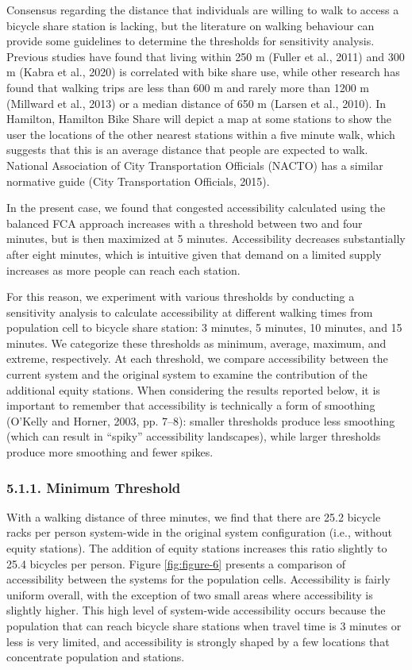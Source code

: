\documentclass[]{elsarticle} %
\begin{document}
Consensus regarding the distance that individuals are willing to walk to
access a bicycle share station is lacking, but the literature on walking
behaviour can provide some guidelines to determine the thresholds for
sensitivity analysis. Previous studies have found that living within 250
m (Fuller et al., 2011) and 300 m (Kabra et al., 2020) is correlated
with bike share use, while other research has found that walking trips
are less than 600 m and rarely more than 1200 m (Millward et al., 2013)
or a median distance of 650 m (Larsen et al., 2010). In Hamilton,
Hamilton Bike Share will depict a map at some stations to show the user
the locations of the other nearest stations within a five minute walk,
which suggests that this is an average distance that people are expected
to walk. National Association of City Transportation Officials (NACTO)
has a similar normative guide (City Transportation Officials, 2015).

In the present case, we found that congested accessibility calculated
using the balanced FCA approach increases with a threshold between two
and four minutes, but is then maximized at 5 minutes. Accessibility
decreases substantially after eight minutes, which is intuitive given
that demand on a limited supply increases as more people can reach each
station.

For this reason, we experiment with various thresholds by conducting a
sensitivity analysis to calculate accessibility at different walking
times from population cell to bicycle share station: 3 minutes, 5
minutes, 10 minutes, and 15 minutes. We categorize these thresholds as
minimum, average, maximum, and extreme, respectively. At each threshold,
we compare accessibility between the current system and the original
system to examine the contribution of the additional equity stations.
When considering the results reported below, it is important to remember
that accessibility is technically a form of smoothing (O'Kelly and
Horner, 2003, pp. 7--8): smaller thresholds produce less smoothing
(which can result in ``spiky'' accessibility landscapes), while larger
thresholds produce more smoothing and fewer spikes.

\hypertarget{minimum-threshold}{%
\subsubsection{5.1.1. Minimum Threshold}\label{minimum-threshold}}

With a walking distance of three minutes, we find that there are 25.2
bicycle racks per person system-wide in the original system
configuration (i.e., without equity stations). The addition of equity
stations increases this ratio slightly to 25.4 bicycles per person.
Figure \ref{fig:figure-6} presents a comparison of accessibility between
the systems for the population cells. Accessibility is fairly uniform
overall, with the exception of two small areas where accessibility is
slightly higher. This high level of system-wide accessibility occurs
because the population that can reach bicycle share stations when travel
time is 3 minutes or less is very limited, and accessibility is strongly
shaped by a few locations that concentrate population and stations.
\end{document}
